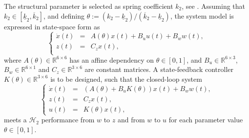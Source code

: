 \documentclass{article}
\newcommand{\ppar}{\theta}                  %
\begin{document}
The structural parameter is selected as spring coefficient $k_2$, see \cite{Camino_2003}. Assuming that $k_2 \in [\underline{k}_2, \overline{k}_2]$, and defining $\ppar := (k_2 - \underline{k}_2)/(\overline{k}_2 - \underline{k}_2)$, the system model is expressed in state-space form as
\begin{equation*}
\left\{ \begin{array}{rcl}
	\dot{x}(t) & = & A(\ppar)x(t) + B_u u(t) + B_w w(t), \\
	z(t) & = & C_z x(t), \\
\end{array} \right.
\end{equation*}
where $A(\ppar) \in \mathbb{R}^{6 \times 6}$ has an affine dependency on $\ppar \in [0,1]$, and $B_u \in \mathbb{R}^{6 \times 3}$, $B_w \in \mathbb{R}^{6 \times 1}$ and $C_z \in \mathbb{R}^{3 \times 6}$ are constant matrices. A state-feedback controller $K(\ppar) \in \mathbb{R}^{3 \times 6}$ is to be designed, such that the closed-loop system
\begin{equation*}
\left\{ \begin{array}{rcl}
	\dot{x}(t) & = & (A(\ppar) + B_u K(\ppar))x(t) + B_w w(t), \\
	z(t) & = & C_z x(t), \\
	u(t) & = & K(\ppar) x(t),
\end{array} \right.
\end{equation*}
meets a $\mathcal{H}_2$ performance from $w$ to $z$ and from $w$ to $u$ for each parameter value $\ppar \in [0,1]$.

\end{document}
